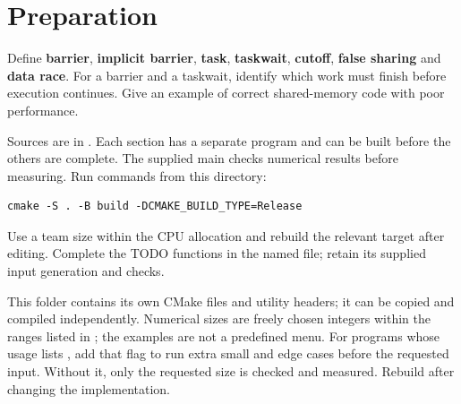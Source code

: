 \section{Preparation}
Define \textbf{barrier}, \textbf{implicit barrier}, \textbf{task},
\textbf{taskwait}, \textbf{cutoff}, \textbf{false sharing} and \textbf{data race}.
For a barrier and a taskwait, identify which work must finish before execution
continues. Give an example of correct shared-memory code with poor performance.

Sources are in . Each section has a separate
program and can be built before the others are complete. The supplied main
checks numerical results before measuring. Run commands from this  directory:
\begin{lstlisting}[style=shell]
cmake -S . -B build -DCMAKE_BUILD_TYPE=Release
\end{lstlisting}
Use a team size within the CPU allocation and rebuild the relevant target after
editing. Complete the TODO functions in the named file; retain its supplied
input generation and checks.

This folder contains its own CMake files and utility headers; it can be copied
and compiled independently. Numerical sizes are freely chosen integers within
the ranges listed in ; the examples are not a predefined menu.
For programs whose usage lists , add that flag to run extra
small and edge cases before the requested input. Without it, only the requested
size is checked and measured. Rebuild after changing the implementation.

